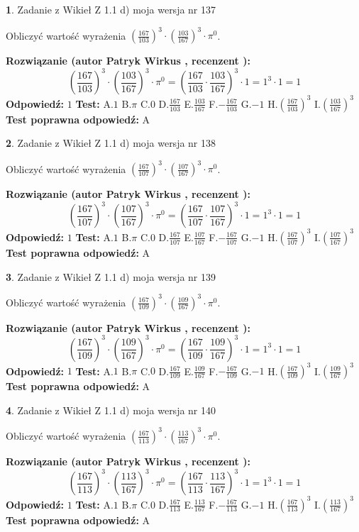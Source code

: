 \documentclass[12pt, a4paper]{article}
\theoremstyle{definition} %
\newtheorem{zad}{}
\newcommand{\zadStart}[1]{\begin{zad}#1\newline}
\newcommand{\zadStop}{\end{zad}}
\newcommand{\rozwStart}[2]{\noindent \textbf{Rozwiązanie (autor #1 , recenzent #2): }\newline}
\newcommand{\rozwStop}{\newline}
\newcommand{\odpStart}{\noindent \textbf{Odpowiedź:}\newline}
\newcommand{\odpStop}{\newline}
\newcommand{\testStart}{\noindent \textbf{Test:}\newline}
\newcommand{\testStop}{\newline}
\newcommand{\kluczStart}{\noindent \textbf{Test poprawna odpowiedź:}\newline}
\newcommand{\kluczStop}{\newline}
\begin{document}
\zadStart{Zadanie z Wikieł Z 1.1 d) moja wersja nr 137}

Obliczyć wartość wyrażenia $(\frac{167}{103})^{3} \cdot (\frac{103}{167})^{3} \cdot \pi^{0}$.
\zadStop
\rozwStart{Patryk Wirkus}{}
$$(\frac{167}{103})^{3} \cdot (\frac{103}{167})^{3} \cdot \pi^{0} = (\frac{167}{103} \cdot \frac{103}{167})^{3} \cdot 1 = 1^{3} \cdot 1 = 1$$
\rozwStop
\odpStart
$1$
\odpStop
\testStart
A.$1$ B.$\pi$ C.$0$ D.$\frac{167}{103}$ E.$\frac{103}{167}$
F.$-\frac{167}{103}$ G.$-1$
H.$(\frac{167}{103})^{3}$
I.$(\frac{103}{167})^{3}$
\testStop
\kluczStart
A
\kluczStop



\zadStart{Zadanie z Wikieł Z 1.1 d) moja wersja nr 138}

Obliczyć wartość wyrażenia $(\frac{167}{107})^{3} \cdot (\frac{107}{167})^{3} \cdot \pi^{0}$.
\zadStop
\rozwStart{Patryk Wirkus}{}
$$(\frac{167}{107})^{3} \cdot (\frac{107}{167})^{3} \cdot \pi^{0} = (\frac{167}{107} \cdot \frac{107}{167})^{3} \cdot 1 = 1^{3} \cdot 1 = 1$$
\rozwStop
\odpStart
$1$
\odpStop
\testStart
A.$1$ B.$\pi$ C.$0$ D.$\frac{167}{107}$ E.$\frac{107}{167}$
F.$-\frac{167}{107}$ G.$-1$
H.$(\frac{167}{107})^{3}$
I.$(\frac{107}{167})^{3}$
\testStop
\kluczStart
A
\kluczStop



\zadStart{Zadanie z Wikieł Z 1.1 d) moja wersja nr 139}

Obliczyć wartość wyrażenia $(\frac{167}{109})^{3} \cdot (\frac{109}{167})^{3} \cdot \pi^{0}$.
\zadStop
\rozwStart{Patryk Wirkus}{}
$$(\frac{167}{109})^{3} \cdot (\frac{109}{167})^{3} \cdot \pi^{0} = (\frac{167}{109} \cdot \frac{109}{167})^{3} \cdot 1 = 1^{3} \cdot 1 = 1$$
\rozwStop
\odpStart
$1$
\odpStop
\testStart
A.$1$ B.$\pi$ C.$0$ D.$\frac{167}{109}$ E.$\frac{109}{167}$
F.$-\frac{167}{109}$ G.$-1$
H.$(\frac{167}{109})^{3}$
I.$(\frac{109}{167})^{3}$
\testStop
\kluczStart
A
\kluczStop



\zadStart{Zadanie z Wikieł Z 1.1 d) moja wersja nr 140}

Obliczyć wartość wyrażenia $(\frac{167}{113})^{3} \cdot (\frac{113}{167})^{3} \cdot \pi^{0}$.
\zadStop
\rozwStart{Patryk Wirkus}{}
$$(\frac{167}{113})^{3} \cdot (\frac{113}{167})^{3} \cdot \pi^{0} = (\frac{167}{113} \cdot \frac{113}{167})^{3} \cdot 1 = 1^{3} \cdot 1 = 1$$
\rozwStop
\odpStart
$1$
\odpStop
\testStart
A.$1$ B.$\pi$ C.$0$ D.$\frac{167}{113}$ E.$\frac{113}{167}$
F.$-\frac{167}{113}$ G.$-1$
H.$(\frac{167}{113})^{3}$
I.$(\frac{113}{167})^{3}$
\testStop
\kluczStart
A
\kluczStop
\end{document}
